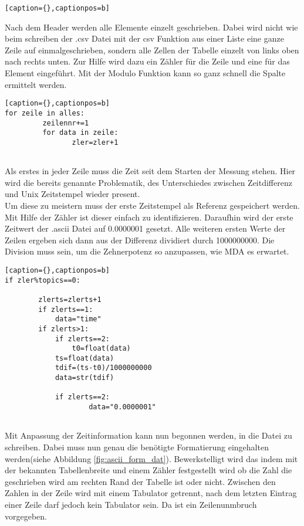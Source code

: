 \documentclass[11pt]{scrartcl}
\begin{document}
\begin{onehalfspace}
\begin{lstlisting}[basicstyle=\small][caption={},captionpos=b]
\end{lstlisting}

Nach dem Header werden alle Elemente einzelt geschrieben. Dabei wird nicht wie beim schreiben der .csv Datei mit der csv Funktion aus einer Liste eine ganze Zeile auf einmalgeschrieben, sondern alle Zellen der Tabelle einzelt von links oben nach rechts unten. Zur Hilfe wird dazu ein Zähler für die Zeile und eine für das Element eingeführt. Mit der Modulo Funktion kann so ganz schnell die Spalte ermittelt werden.

\begin{lstlisting}[basicstyle=\small][caption={},captionpos=b]
for zeile in alles:
		 zeilennr+=1
		 for data in zeile:
				zler=zler+1
				
\end{lstlisting}

Als erstes in jeder Zeile muss die Zeit seit dem Starten der Messung stehen.
Hier wird die bereits genannte Problematik, des Unterschiedes zwischen Zeitdifferenz und Unix Zeitstempel wieder present. \\
Um diese zu meistern muss der erste Zeitstempel als Referenz gespeichert werden. Mit Hilfe der Zähler ist dieser einfach zu identifizieren. 
Daraufhin wird der erste Zeitwert der .ascii Datei auf 0.0000001 gesetzt.
Alle weiteren ersten Werte der Zeilen ergeben sich dann aus der Differenz dividiert durch 1000000000. Die Division muss sein, um die Zehnerpotenz so anzupassen, wie MDA es erwartet.

\begin{lstlisting}[basicstyle=\small][caption={},captionpos=b]
if zler%topics==0:
						
		zlerts=zlerts+1
		if zlerts==1:
			data="time"
		if zlerts>1:
			if zlerts==2:
				t0=float(data)
			ts=float(data)
			tdif=(ts-t0)/1000000000
			data=str(tdif)
						
			if zlerts==2:
					data="0.0000001"
					
\end{lstlisting}

Mit Anpassung der Zeitinformation kann nun begonnen werden, in die Datei zu schreiben. Dabei muss nun genau die benötigte Formatierung eingehalten werden(siehe Abbildung  \ref{fig:ascii_form_dat}). Bewerkstelligt wird das indem mit der bekannten Tabellenbreite und einem Zähler festgestellt wird ob die Zahl die geschrieben wird am rechten Rand der Tabelle ist oder nicht. Zwischen den Zahlen in der Zeile wird mit einem Tabulator getrennt, nach dem letzten Eintrag einer Zeile darf jedoch kein Tabulator sein. Da ist ein Zeilenunmbruch vorgegeben.


\end{onehalfspace}
\end{document}

